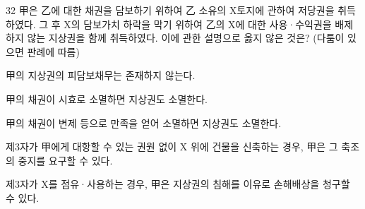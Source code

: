 \begin{question}{32}
甲은 乙에 대한 채권을 담보하기 위하여 乙 소유의 X토지에 관하여 저당권을 취득하였다. 그 후 X의 담보가치 하락을 막기 위하여 乙의 X에 대한 사용·수익권을 배제하지 않는 지상권을 함께 취득하였다. 이에 관한 설명으로 옳지 않은 것은? (다툼이 있으면 판례에 따름)
\begin{choices}
  \item 甲의 지상권의 피담보채무는 존재하지 않는다.
  \item 甲의 채권이 시효로 소멸하면 지상권도 소멸한다.
  \item 甲의 채권이 변제 등으로 만족을 얻어 소멸하면 지상권도 소멸한다.
  \item 제3자가 甲에게 대항할 수 있는 권원 없이 X 위에 건물을 신축하는 경우, 甲은 그 축조의 중지를 요구할 수 있다.
  \item 제3자가 X를 점유·사용하는 경우, 甲은 지상권의 침해를 이유로 손해배상을 청구할 수 있다.
\end{choices}
\end{question}
